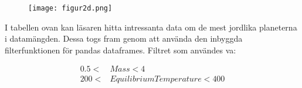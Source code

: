 \documentclass[a4paper]{article}
\begin{document}
\begin{table}[H]
    \centering
    \caption{}
    \label{tab:2}
\end{table}

\begin{figure}[H]
    \begin{small}
        \begin{center}
            \texttt{[image: figur2d.png]}
        \end{center}
        \caption{}
        \label{fig:2d}
    \end{small}
\end{figure}

I tabellen ovan kan läsaren hitta intressanta data om de mest jordlika planeterna i datamängden. Dessa togs fram genom att använda den inbyggda filterfunktionen för pandas dataframes. Filtret som användes va:

\begin{align}
    0.5 < &Mass < 4\\
    200 < &Equilibrium Temperature < 400
\end{align}
\end{document}
